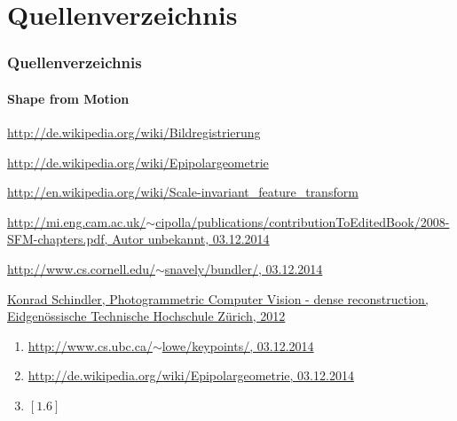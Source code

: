 \documentclass{beamer}
\begin{document}
\section{Quellenverzeichnis}
\begin{frame}
	\frametitle{Quellenverzeichnis}
	\framesubtitle{Shape from Motion}
	
	\begin{tiny}
	\begin{enumerate}[label={[1.\arabic*]}]
		\item
		\href{http://de.wikipedia.org/wiki/Bildregistrierung}{http://de.wikipedia.org/wiki/Bildregistrierung}
		\item
		\href{http://de.wikipedia.org/wiki/Epipolargeometrie}{http://de.wikipedia.org/wiki/Epipolargeometrie}
		\item
		\href{http://en.wikipedia.org/wiki/Scale-invariant_feature_transform}{http://en.wikipedia.org/wiki/Scale-invariant\_feature\_transform}
		\item
		\href{http://mi.eng.cam.ac.uk/~cipolla/publications/contributionToEditedBook/2008-SFM-chapters.pdf}{http://mi.eng.cam.ac.uk/$\sim$cipolla/publications/contributionToEditedBook/2008-SFM-chapters.pdf, Autor unbekannt, 03.12.2014}
		\item
		\href{http://www.cs.cornell.edu/~snavely/bundler/}{http://www.cs.cornell.edu/$\sim$snavely/bundler/, 03.12.2014}
		\item
		\href{http://www.igp.ethz.ch/photogrammetry/education/lehrveranstaltungen/PCV_HS12/content_folder/PCV-HS2012-slides-multiview.pdf}{Konrad Schindler, Photogrammetric Computer Vision -  dense reconstruction, Eidgenössische Technische Hochschule Zürich, 2012}
	\end{enumerate}
	\vspace{1em}
	\begin{enumerate}[label={Fig. 1.\arabic*}]
		\item \href{http://www.cs.ubc.ca/~lowe/keypoints/}{http://www.cs.ubc.ca/$\sim$lowe/keypoints/, 03.12.2014}
		\item \href{http://de.wikipedia.org/wiki/Epipolargeometrie}{http://de.wikipedia.org/wiki/Epipolargeometrie, 03.12.2014}
		\item $\left[1.6\right]$
	\end{enumerate}
	\end{tiny}
\end{frame}
\end{document}
